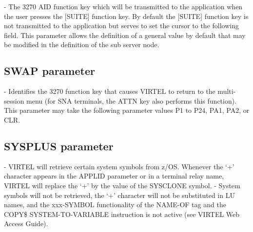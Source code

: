 \documentclass[letterpaper,10pt,english]{sphinxmanual}
\begin{document}
 - The 3270 AID function key which will be transmitted to the application when the user presses the {[}SUITE{]} function key. By default the {[}SUITE{]} function key is not transmitted to the application but serves to set the cursor to the following field. This parameter allows the definition of a general value by default that may be modified in the definition of the sub server node.

\ignorespaces 

\subsection{SWAP parameter}
\label{\detokenize{Installation_Guide:swap-parameter}}\label{\detokenize{Installation_Guide:index-120}}
\begin{sphinxVerbatim}[commandchars=\\\{\}]
 
\end{sphinxVerbatim}

 - Identifies the 3270 function key that causes VIRTEL to return to the multi-session menu (for SNA terminals, the ATTN key also performs this function). This parameter may take the following parameter values P1 to P24, PA1, PA2, or CLR.

\ignorespaces 

\subsection{SYSPLUS parameter}
\label{\detokenize{Installation_Guide:sysplus-parameter}}\label{\detokenize{Installation_Guide:index-121}}
\begin{sphinxVerbatim}[commandchars=\\\{\}]
 
\end{sphinxVerbatim}

 - VIRTEL will retrieve certain system symbols from z/OS. Whenever the ‘+’ character appears in the APPLID parameter or in a terminal relay name, VIRTEL will replace the ‘+’ by the value of the SYSCLONE symbol.
 - System symbols will not be retrieved, the ‘+’ character will not be substituted in LU names, and the xxx-SYMBOL functionality of the NAME-OF tag and the COPY\$ SYSTEM-TO-VARIABLE instruction is not active (see VIRTEL Web Access Guide).
\end{document}

